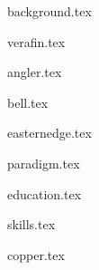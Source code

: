 \documentclass[11pt]{article}
\begin{document}
{background.tex}


{verafin.tex}

{angler.tex}

{bell.tex}

{easternedge.tex}

{paradigm.tex}



{education.tex}


{skills.tex}


{copper.tex}


\end{document}
